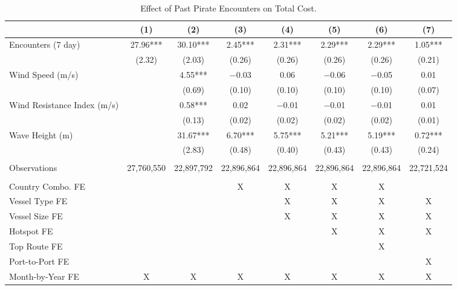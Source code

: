 \begin{table}
\centering
\caption{Effect of Past Pirate Encounters on Total Cost. \label{tab:spec-total-table}}
\centering
\begin{adjustbox}{width = .9\textwidth}
\begin{threeparttable}
\begin{tabular}[t]{lccccccc}
\toprule
  & (1) & (2) & (3) & (4) & (5) & (6) & (7)\\
\midrule
Encounters (7 day) & \num{27.96}*** & \num{30.10}*** & \num{2.45}*** & \num{2.31}*** & \num{2.29}*** & \num{2.29}*** & \num{1.05}***\\
 & (\num{2.32}) & (\num{2.03}) & (\num{0.26}) & (\num{0.26}) & (\num{0.26}) & (\num{0.26}) & (\num{0.21})\\
Wind Speed (m/s) &  & \num{4.55}*** & \num{-0.03} & \num{0.06} & \num{-0.06} & \num{-0.05} & \num{0.01}\\
 &  & (\num{0.69}) & (\num{0.10}) & (\num{0.10}) & (\num{0.10}) & (\num{0.10}) & (\num{0.07})\\
Wind Resistance Index (m/s) &  & \num{0.58}*** & \num{0.02} & \num{-0.01} & \num{-0.01} & \num{-0.01} & \num{0.01}\\
 &  & (\num{0.13}) & (\num{0.02}) & (\num{0.02}) & (\num{0.02}) & (\num{0.02}) & (\num{0.01})\\
Wave Height (m) &  & \num{31.67}*** & \num{6.70}*** & \num{5.75}*** & \num{5.21}*** & \num{5.19}*** & \num{0.72}***\\
 &  & (\num{2.83}) & (\num{0.48}) & (\num{0.40}) & (\num{0.43}) & (\num{0.43}) & (\num{0.24})\\
 &  &  &  &  &  &  & \\
Observations & 27,760,550 & 22,897,792 & 22,896,864 & 22,896,864 & 22,896,864 & 22,896,864 & 22,721,524\\
 &  &  &  &  &  &  & \\
Country Combo. FE &  &  & X & X & X & X & \\
Vessel Type FE &  &  &  & X & X & X & X\\
Vessel Size FE &  &  &  & X & X & X & X\\
Hotspot FE &  &  &  &  & X & X & X\\
Top Route FE &  &  &  &  &  & X & \\
Port-to-Port FE &  &  &  &  &  &  & X\\
Month-by-Year FE & X & X & X & X & X & X & X\\
\bottomrule
\end{tabular}
\begin{tablenotes}

\end{tablenotes}
\end{threeparttable}
\end{adjustbox}
\end{table}
